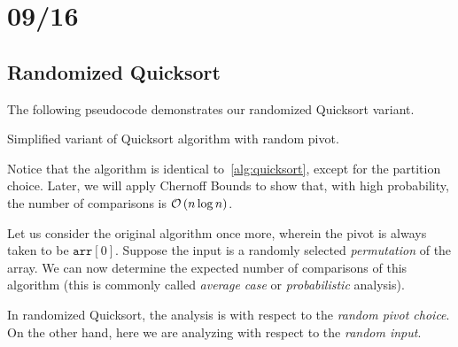 \section{09/16}
\subsection{Randomized Quicksort}
The following pseudocode demonstrates our randomized Quicksort variant.

\begin{algorithm}[H]
    \caption{Simplified variant of Quicksort algorithm with random pivot.}
    \label{alg:randquicksort}
\end{algorithm}

Notice that the algorithm is identical to~\cref{alg:quicksort}, except for the
partition choice. Later, we will apply Chernoff Bounds to show that, with high
probability, the number of comparisons is $$.

Let us consider the original algorithm once more, wherein the pivot is always
taken to be $\texttt{arr}[0]$. Suppose the input is a randomly selected
\emph{permutation} of the array. We can now determine the expected number of
comparisons of this algorithm (this is commonly called \emph{average case} or
\emph{probabilistic} analysis). 

In randomized Quicksort, the analysis is with respect to the \emph{random pivot
choice}. On the other hand, here we are analyzing with respect to the
\emph{random input}.

